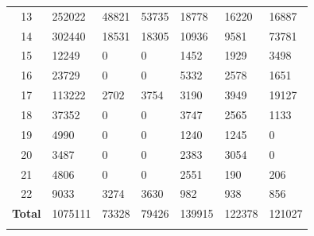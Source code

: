 \begin{table}[p]
\begin{tabularx}{\textwidth}{c|YYYYYY}
        13 & 252022 & 48821 & 53735 & 18778 & 16220 & 16887 \\
        14 & 302440 & 18531 & 18305 & 10936 & 9581 & 73781 \\
        15 & 12249 & 0 & 0 & 1452 & 1929 & 3498 \\
        16 & 23729 & 0 & 0 & 5332 & 2578 & 1651 \\
        17 & 113222 & 2702 & 3754 & 3190 & 3949 & 19127 \\
        18 & 37352 & 0 & 0 & 3747 & 2565 & 1133 \\
        19 & 4990 & 0 & 0 & 1240 & 1245 & 0 \\
        20 & 3487 & 0 & 0 & 2383 & 3054 & 0 \\
        21 & 4806 & 0 & 0 & 2551 & 190 & 206 \\
        22 & 9033 & 3274 & 3630 & 982 & 938 & 856 \\
        \hline
        \textbf{Total} & 1075111 & 73328 & 79426 & 139915 & 122378 & 121027 \\
    \end{tabularx}
\end{table}

